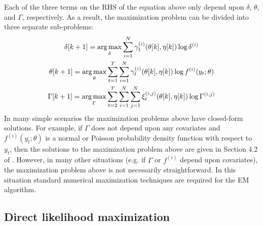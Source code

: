 Each of the three terms on the RHS of the equation above only depend upon $\delta$, $\theta$, and $\Gamma$, respectively. As a result, the maximization problem can be divided into three separate sub-problems:
%
\begin{gather}
    \delta[k+1] = \operatorname*{arg\,max}_{\delta} \sum_{i=1}^N \gamma^{(i)}_1(\theta[k],\eta[k]) \log \delta^{(i)} \\
    \theta[k+1] = \operatorname*{arg\,max}_{\theta} \sum_{t = 1}^T \sum_{i=1}^N \gamma^{(i)}_t(\theta[k],\eta[k]) \log f^{(i)}(y_t;\theta) \\
    \Gamma[k+1] = \operatorname*{arg\,max}_{\Gamma} \sum_{t=2}^{T} \sum_{i=1}^N \sum_{j=1}^N \xi_t^{(i,j)}(\theta[k],\eta[k]) \log \Gamma^{(i,j)}
\end{gather}
%
In many simple scenarios the maximization problems above have closed-form solutions. For example, if $\Gamma$ does not depend upon any covariates and $f^{(i)}(y_t;\theta)$ is a normal or Poisson probability density function with respect to $y_t$, then the solutions to the maximization problem above are given in Section 4.2 of \citet{Zucchini:2016}. However, in many other situations (e.g. if $\Gamma$ or $f^{(i)}$ depend upon covariates), the maximization problem above is not necessarily straightforward. In this situation standard numerical maximization techniques are required for the EM algorithm.

\subsection{Direct likelihood maximization}

